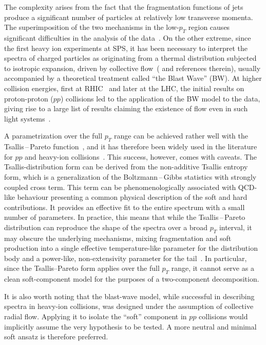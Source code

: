 \documentclass[pdflatex,sn-mathphys-num]{sn-jnl}%
\begin{document}
The complexity arises from the fact that the fragmentation functions of jets produce a significant number of particles at relatively low transverse momenta. The superimposition of the two mechanisms in the low-$p_T$ region causes significant difficulties in the analysis of the data~\cite{CDF:2001hmt}. On the other extreme, since the first heavy ion experiments at SPS, it has been necessary to interpret the spectra of charged particles as originating from a thermal distribution subjected to isotropic expansion, driven by collective flow~(\cite{NA44:1998hna, Roland:1999zby, Andersen:1998vu, ATLAS:2025ztg} and references therein), usually accompanied by a theoretical treatment called ``the Blast Wave'' (BW). At higher collision energies, first at RHIC~\cite{STAR:2008med} and later at the LHC, the initial results on proton-proton ($pp$) collisions led to the application of the BW model to the data, giving rise to a large list of results claiming the existence of flow even in such light systems~\cite{Kisiel:2010xy, Florkowski:2016xbk, Biro2025}.

A parametrization over the full $p_T$ range can be achieved rather well with the Tsallis\,--\,Pareto function~\cite{Tsallis:1987eu}, and it has therefore been widely used in the literature for $pp$ and heavy-ion collisions~\cite{Gu:2022xjn, Biro:2020kve}. This success, however, comes with caveats. The Tsallis-distribution form can be derived from the non-additive Tsallis entropy form, which is a generalization of the Boltzmann\,--\,Gibbs statistics with strongly coupled cross term. This term can be phenomenologically associated with QCD-like behaviour presenting a common physical description of the soft and hard contributions. It provides an effective fit to the entire spectrum with a small number of parameters. In practice, this means that while the Tsallis\,--\,Pareto distribution can reproduce the shape of the spectra over a broad $p_T$ interval, it may obscure the underlying mechanisms, mixing fragmentation and soft production into a single effective temperature-like parameter for the distribution body and a power-like, non-extensivity parameter for the tail~\cite{Yang:2021bab}. In particular, since the Tsallis--Pareto form applies over the full $p_T$ range, it cannot serve as a clean soft-component model for the purposes of a two-component decomposition.


It is also worth noting that the blast-wave model, while successful in describing spectra in heavy-ion collisions, was designed under the assumption of collective radial flow. Applying it to isolate the ``soft'' component in $pp$ collisions would implicitly assume the very hypothesis to be tested. A more neutral and minimal soft ansatz is therefore preferred.
\end{document}
